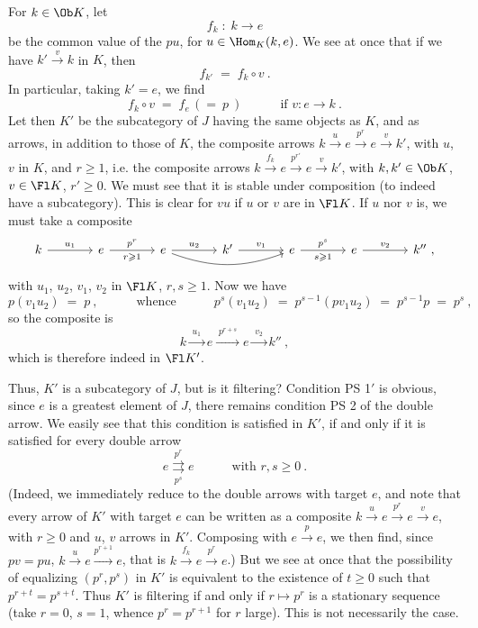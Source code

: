 For $k \in \Ob K$, let
\[ f_k \;:\; k \longrightarrow e \]
be the common value of the $pu$, for $u \in \Hom_K(k,e)$. We see at once that if we have $k' \xrightarrow{v} k$ in $K$, then
\[ f_{k'} \;=\; f_k \circ v \ . \]
In particular, taking $k' = e$, we find
\[ f_k \circ v \;=\; f_e \,(=\ p\ ) \qquad\quad \text{if } v : e \longrightarrow k \ . \]
Let then $K'$ be the subcategory of $J$ having the same objects as $K$, and as arrows, in addition to those of $K$, the composite arrows $k \xrightarrow{u} e \xrightarrow{p^r} e \xrightarrow{v} k'$, with $u$, $v$ in $K$, and $r \geqslant 1$, i.e. the composite arrows $k \xrightarrow{f_k} e \xrightarrow{p^{r'}} e \xrightarrow{v} k'$, with $k, k' \in \Ob K$, $v \in \Fl K$, $r' \geqslant 0$. We must see that it is stable under composition (to indeed have a subcategory). This is clear for $vu$ if $u$ or $v$ are in $\Fl K$. If $u$ nor $v$ is, we must take a composite
\[
\begin{tikzcd}[column sep=large]
k \arrow[r, "u_1"] & e \arrow[r, "p^r", "r\geqslant 1"'] & e \arrow[r, "u_2"] \arrow[rr, bend right=20] & k' \arrow[r, "v_1"] & e \arrow[r, "p^s", "s\geqslant 1"'] & e \arrow[r, "v_2"] & k'' \ ,
\end{tikzcd}
\]
with $u_1$, $u_2$, $v_1$, $v_2$ in $\Fl K$, $r, s \geqslant 1$. Now we have
\[ p(v_1u_2) \;=\; p \ , \qquad\quad \text{whence} \qquad\quad p^s(v_1u_2) \;=\; p^{s-1}(pv_1u_2) \;=\; p^{s-1}p \;=\; p^s \ , \]
so the composite is
\[ k \xrightarrow{\;u_1\;} e \xrightarrow{\;p^{r+s}\;} e \xrightarrow{\;v_2\;} k'' \ , \]
which
is therefore indeed in $\Fl K'$.

Thus, $K'$ is a subcategory of $J$, but is it filtering? Condition PS 1$'$ is obvious, since $e$ is a greatest element of $J$, there remains condition PS 2 of the double arrow. We easily see that this condition is satisfied in $K'$, if and only if it is satisfied for every double arrow
\[ e \overset{p^r}{\underset{p^s}{\rightrightarrows}} e \qquad\quad \text{with } r, s \geqslant 0 \ . \]
(Indeed, we immediately reduce to the double arrows with target $e$, and note that every arrow of $K'$ with target $e$ can be written as a composite $k \xrightarrow{u} e \xrightarrow{p^r} e \xrightarrow{v} e$, with $r \geqslant 0$ and $u$, $v$ arrows in $K'$. Composing with $e \xrightarrow{p} e$, we then find, since $pv = pu$, $k \xrightarrow{u} e \xrightarrow{p^{r+1}} e$, that is $k \xrightarrow{f_k} e \xrightarrow{p^r} e$.) But we see at once that the possibility of equalizing $(p^r, p^s)$ in $K'$ is equivalent to the existence of $t \geqslant 0$ such that $p^{r+t} = p^{s+t}$. Thus $K'$ is filtering if and only if $r \longmapsto p^r$ is a stationary sequence (take $r = 0$, $s = 1$, whence $p^r = p^{r+1}$ for $r$ large). This is
not necessarily the case.


